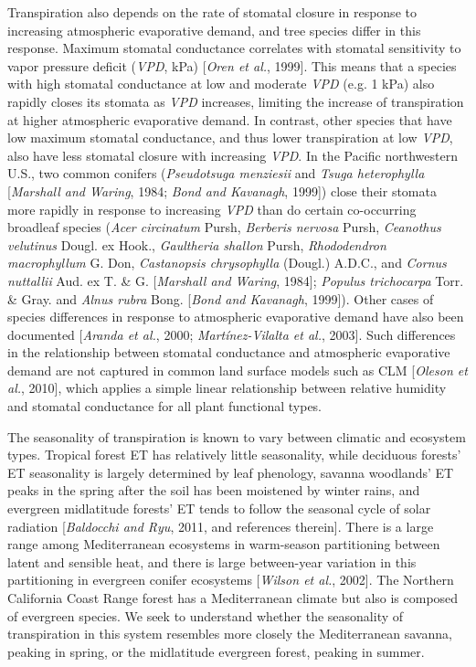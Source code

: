 Transpiration also depends on the rate of stomatal closure in response to increasing atmospheric evaporative demand, and tree species differ in this response.  Maximum stomatal conductance correlates with stomatal sensitivity to vapor pressure deficit (\textit{VPD}, kPa) [\textit{Oren et al.}, 1999].  This means that a species with high stomatal conductance at low and moderate \textit{VPD} (e.g. 1 kPa) also rapidly closes its stomata as \textit{VPD} increases, limiting the increase of transpiration at higher atmospheric evaporative demand.  In contrast, other species that have low maximum stomatal conductance, and thus lower transpiration at low \textit{VPD}, also have less stomatal closure with increasing \textit{VPD}.  In the Pacific northwestern U.S., two common conifers (\textit{Pseudotsuga menziesii} and \textit{Tsuga heterophylla} [\textit{Marshall and Waring}, 1984; \textit{Bond and Kavanagh}, 1999]) close their stomata more rapidly in response to increasing \textit{VPD} than do certain co-occurring broadleaf species (\textit{Acer circinatum} Pursh, \textit{Berberis nervosa} Pursh, \textit{Ceanothus velutinus} Dougl. ex Hook., \textit{Gaultheria shallon} Pursh, \textit{Rhododendron macrophyllum} G. Don, \textit{Castanopsis chrysophylla} (Dougl.) A.D.C., and \textit{Cornus nuttallii} Aud. ex T. \& G. [\textit{Marshall and Waring}, 1984]; \textit{Populus trichocarpa} Torr. \& Gray. and \textit{Alnus rubra} Bong. [\textit{Bond and Kavanagh}, 1999]).  Other cases of species differences in response to atmospheric evaporative demand have also been documented [\textit{Aranda et al.}, 2000; \textit{Mart\'inez-Vilalta et al.}, 2003].  Such differences in the relationship between stomatal conductance and atmospheric evaporative demand are not captured in common land surface models such as CLM [\textit{Oleson et al.}, 2010], which applies a simple linear relationship between relative humidity and stomatal conductance for all plant functional types.

The seasonality of transpiration is known to vary between climatic and ecosystem types.  Tropical forest ET has relatively little seasonality, while deciduous forests' ET seasonality is largely determined by leaf phenology, savanna woodlands' ET peaks in the spring after the soil has been moistened by winter rains, and evergreen midlatitude forests' ET tends to follow the seasonal cycle of solar radiation [\textit{Baldocchi and Ryu}, 2011, and references therein].  There is a large range among Mediterranean ecosystems in warm-season partitioning between latent and sensible heat, and there is large between-year variation in this partitioning in evergreen conifer ecosystems [\textit{Wilson et al.}, 2002].  The Northern California Coast Range forest has a Mediterranean climate but also is composed of evergreen species.  We seek to understand whether the seasonality of transpiration in this system resembles more closely the Mediterranean savanna, peaking in spring, or the midlatitude evergreen forest, peaking in summer.

